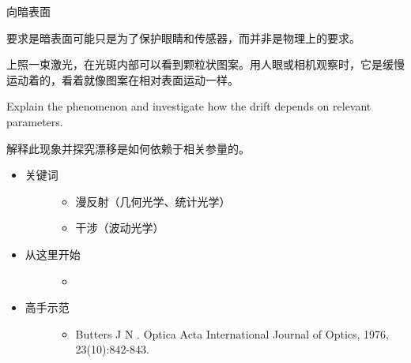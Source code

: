 \documentclass[a4paper,10pt,english]{sphinxmanual}
\begin{document}
向暗表面 %
\begin{footnote}[7]\sphinxAtStartFootnote
要求是暗表面可能只是为了保护眼睛和传感器，而并非是物理上的要求。
%
\end{footnote} 上照一束激光，在光斑内部可以看到颗粒状图案。用人眼或相机观察时，它是缓慢运动着的，看着就像图案在相对表面运动一样。

Explain the phenomenon and investigate how the drift depends on relevant parameters.

解释此现象并探究漂移是如何依赖于相关参量的。
\begin{itemize}
\item {} \begin{description}
\item[{关键词}] \leavevmode\begin{itemize}
\item {} 
漫反射（几何光学、统计光学）

\item {} 
干涉（波动光学）

\end{itemize}

\end{description}

\item {} \begin{description}
\item[{从这里开始}] \leavevmode\begin{itemize}
\item {} 

\end{itemize}

\end{description}

\item {} \begin{description}
\item[{高手示范}] \leavevmode\begin{itemize}
\item {} 
Butters J N .  Optica Acta International Journal of Optics, 1976, 23(10):842-843.

\end{itemize}

\end{description}

\end{itemize}
\end{document}
